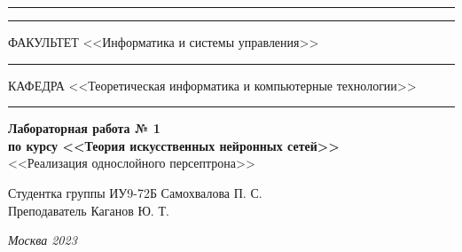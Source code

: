 \documentclass[a4paper, 14pt]{extarticle}
\begin{document}
\begin{titlepage}
\vspace{-25pt}
\hspace{-35pt}\rule{\textwidth}{2.3pt}

\vspace*{-20.3pt}
\hspace{-35pt}\rule{\textwidth}{0.4pt}

\vspace{1.5ex}
\hspace{-35pt} \noindent \small ФАКУЛЬТЕТ\hspace{80pt} <<Информатика и системы управления>>

\vspace*{-16pt}
\hspace{47pt}\rule{0.83\textwidth}{0.4pt}

\vspace{0.5ex}
\hspace{-35pt} \noindent \small КАФЕДРА\hspace{50pt} <<Теоретическая информатика и компьютерные технологии>>

\vspace*{-16pt}
\hspace{30pt}\rule{0.866\textwidth}{0.4pt}
  
\vspace{11em}

\begin{center}
\Large {\bf Лабораторная работа № 1} \\
\large {\bf по курсу <<Теория искусственных нейронных сетей>>} \\
\large <<Реализация однослойного персептрона>>
\end{center}\normalsize

\vspace{8em}


\begin{flushright}
  {Студентка группы ИУ9-72Б Самохвалова П. С. \hspace*{15pt}\\
  \vspace{2ex}
  Преподаватель Каганов Ю. Т.\hspace*{15pt}}
\end{flushright}

\bigskip

\vfill
 

\begin{center}
\textsl{Москва 2023}
\end{center}
\end{titlepage}
\end{document}
